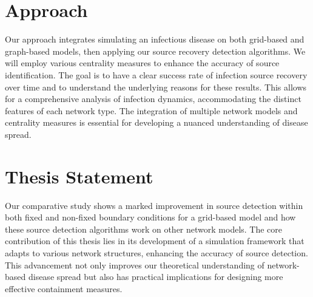 \section{Approach}
Our approach integrates simulating an infectious disease on both grid-based and graph-based models, then applying our source recovery detection algorithms. We will employ various centrality measures to enhance the accuracy of source identification. The goal is to have a clear success rate of infection source recovery over time and to understand the underlying reasons for these results. This allows for a comprehensive analysis of infection dynamics, accommodating the distinct features of each network type. The integration of multiple network models and centrality measures is essential for developing a nuanced understanding of disease spread.

\section{Thesis Statement}
Our comparative study shows a marked improvement in source detection within both fixed and non-fixed boundary conditions for a grid-based model and how these source detection algorithms work on other network models. The core contribution of this thesis lies in its development of a simulation framework that adapts to various network structures, enhancing the accuracy of source detection. This advancement not only improves our theoretical understanding of network-based disease spread but also has practical implications for designing more effective containment measures.